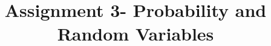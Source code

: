 \documentclass[journal,12pt,twocolumn]{IEEEtran}
\DeclareMathOperator*{\Res}{Res}
\begin{document}
\newcommand{\BEQA}{\begin{eqnarray}}
\newcommand{\EEQA}{\end{eqnarray}}
\newcommand{\define}{\stackrel{\triangle}{=}}

\raggedbottom
\setlength{\parindent}{0pt}
\providecommand{\mbf}{\mathbf}
\providecommand{\pr}[1]{\ensuremath{\Pr\left(#1\right)}}
\providecommand{\qfunc}[1]{\ensuremath{Q\left(#1\right)}}
\providecommand{\sbrak}[1]{\ensuremath{{}\left[#1\right]}}
\providecommand{\lsbrak}[1]{\ensuremath{{}\left[#1\right.}}
\providecommand{\rsbrak}[1]{\ensuremath{{}\left.#1\right]}}
\providecommand{\brak}[1]{\ensuremath{\left(#1\right)}}
\providecommand{\lbrak}[1]{\ensuremath{\left(#1\right.}}
\providecommand{\rbrak}[1]{\ensuremath{\left.#1\right)}}
\providecommand{\cbrak}[1]{\ensuremath{\left\{#1\right\}}}
\providecommand{\lcbrak}[1]{\ensuremath{\left\{#1\right.}}
\providecommand{\rcbrak}[1]{\ensuremath{\left.#1\right\}}}
\theoremstyle{remark}
\newtheorem{rem}{Remark}
\newcommand{\sgn}{\mathop{\mathrm{sgn}}}
\providecommand{\abs}[1]{\vert#1\vert}
\providecommand{\res}[1]{\Res\displaylimits_{#1}} 
\providecommand{\norm}[1]{\lVert#1\rVert}
\providecommand{\mtx}[1]{\mathbf{#1}}
\providecommand{\mean}[1]{E[ #1 ]}
\providecommand{\fourier}{\overset{\mathcal{F}}{ \rightleftharpoons}}
\providecommand{\system}{\overset{\mathcal{H}}{ \longleftrightarrow}}
\newcommand{\solution}{\noindent \textbf{Solution: }}
\newcommand{\cosec}{\,\text{cosec}\,}
\providecommand{\dec}[2]{\ensuremath{\overset{#1}{\underset{#2}{\gtrless}}}}
\newcommand{\myvec}[1]{\ensuremath{\begin{pmatrix}#1\end{pmatrix}}}
\newcommand{\mydet}[1]{\ensuremath{\begin{vmatrix}#1\end{vmatrix}}}
\makeatletter
{}
\makeatother
\let\StandardTheFigure\thefigure
\let\vec\mathbf
\renewcommand{\thefigure}{\theproblem}
\def\putbox#1#2#3{\makebox[0in][l]{\makebox[#1][l]{}\raisebox{\baselineskip}[0in][0in]{\raisebox{#2}[0in][0in]{#3}}}}
     \def\rightbox#1{\makebox[0in][r]{#1}}
     \def\centbox#1{\makebox[0in]{#1}}
     \def\topbox#1{\raisebox{-\baselineskip}[0in][0in]{#1}}
     \def\midbox#1{\raisebox{-0.5\baselineskip}[0in][0in]{#1}}
\vspace{3cm}
\title{Assignment 3- Probability and Random Variables}
\end{document}

